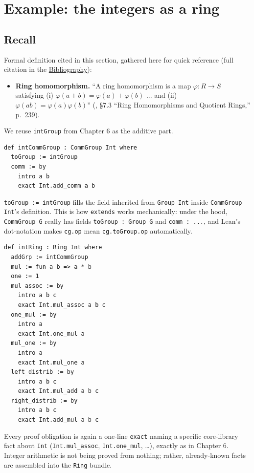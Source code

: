 \section{Example: the integers as a ring}\label{sec:08-rings:04-integers-example:1}

\subsection{Recall}\label{sec:08-rings:04-integers-example:0b}

Formal definition cited in this section, gathered here for quick reference (full citation in the \hyperref[sec:root:bibliography:1]{Bibliography}):

\begin{itemize}
\tightlist
\item
  \textbf{Ring homomorphism.} ``A ring homomorphism is a map \(\varphi : R \to S\) satisfying (i) \(\varphi(a+b) = \varphi(a)+\varphi(b)\) ... and (ii) \(\varphi(ab) = \varphi(a)\varphi(b)\)'' (\cite{DummitFoote2003}, §7.3 ``Ring Homomorphisms and Quotient Rings,'' p.~239).
\end{itemize}

We reuse \texttt{intGroup} from Chapter 6 as the additive part.

\begin{lstlisting}
def intCommGroup : CommGroup Int where
  toGroup := intGroup
  comm := by
    intro a b
    exact Int.add_comm a b
\end{lstlisting}

\texttt{toGroup := intGroup} fills the field inherited from \texttt{Group Int} inside \texttt{CommGroup Int}'s definition. This is how \texttt{extends} works mechanically: under the hood, \texttt{CommGroup G} really has fields \texttt{toGroup : Group G} and \texttt{comm : ...}, and Lean's dot-notation makes \texttt{cg.op} mean \texttt{cg.toGroup.op} automatically.

\begin{lstlisting}
def intRing : Ring Int where
  addGrp := intCommGroup
  mul := fun a b => a * b
  one := 1
  mul_assoc := by
    intro a b c
    exact Int.mul_assoc a b c
  one_mul := by
    intro a
    exact Int.one_mul a
  mul_one := by
    intro a
    exact Int.mul_one a
  left_distrib := by
    intro a b c
    exact Int.mul_add a b c
  right_distrib := by
    intro a b c
    exact Int.add_mul a b c
\end{lstlisting}

Every proof obligation is again a one-line \texttt{exact} naming a specific core-library fact about \texttt{Int} (\texttt{Int.mul\_\allowbreak{}assoc}, \texttt{Int.one\_\allowbreak{}mul}, \ldots), exactly as in Chapter 6. Integer arithmetic is not being proved from nothing; rather, already-known facts are assembled into the \texttt{Ring} bundle.

